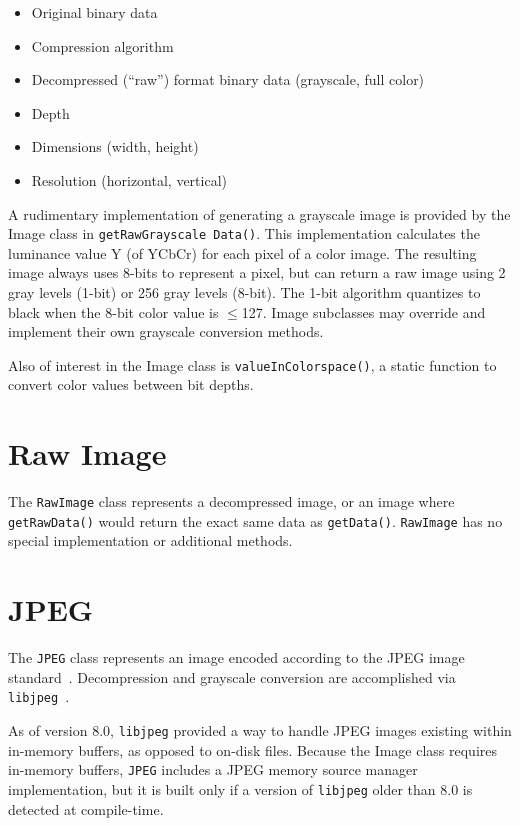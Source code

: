 \begin{itemize}
\item Original binary data
\item Compression algorithm
\item Decompressed (``raw'') format binary data (grayscale, full color)
\item Depth
\item Dimensions (width, height)
\item Resolution (horizontal, vertical)
\end{itemize}

A rudimentary implementation of generating a grayscale image is provided by the
Image class in \texttt{get\allowbreak Raw\allowbreak Grayscale\allowbreak 
Data()}.  This implementation calculates the luminance value Y (of YCbCr) for 
each pixel of a color image.  The resulting image always uses 8-bits to 
represent a pixel, but can return a raw image using 2 gray levels (1-bit) or 256 
gray levels (8-bit).  The 1-bit algorithm quantizes to black when the 8-bit 
color value is \ensuremath{\leq}127.  Image subclasses  may override and 
implement their own grayscale conversion methods.

Also of interest in the Image class is 
\texttt{value\allowbreak In\allowbreak Colorspace()}, a static function to 
convert color values between bit depths.

\section{Raw Image}
\label{sec-rawimage}
The \texttt{RawImage} class represents a decompressed image, or an image where
\texttt{get\allowbreak Raw\allowbreak Data()} would return the exact same data
as \texttt{get\allowbreak Data()}.  \texttt{RawImage} has no special implementation or additional methods.

\section{JPEG}
\label{sec-image-jpeg}
The \texttt{JPEG} class represents an image encoded according to the JPEG image 
standard~\cite{jpeg}.  Decompression and grayscale conversion are accomplished
via \texttt{libjpeg}~\cite{libjpeg}.

As of version 8.0, \texttt{libjpeg} provided a way to handle JPEG images 
existing within in-memory buffers, as opposed to on-disk files.  Because the 
Image class requires in-memory buffers, \texttt{JPEG} includes a JPEG memory
source manager implementation, but it is built only if a version of 
\texttt{libjpeg} older than 8.0 is detected at compile-time.

